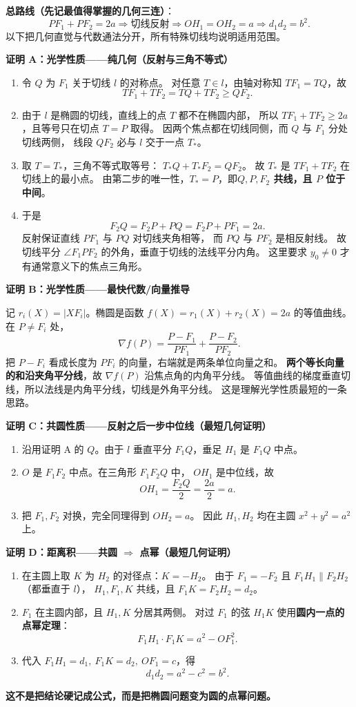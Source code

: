 \begin{proofbox}
\textbf{总路线（先记最值得掌握的几何三连）}：
\[
\boxed{PF_1+PF_2=2a}
\Longrightarrow\boxed{\text{切线反射}}
\Longrightarrow\boxed{OH_1=OH_2=a}
\Longrightarrow\boxed{d_1d_2=b^2}.
\]
以下把几何直觉与代数通法分开，所有特殊切线均说明适用范围。

\medskip
\textbf{证明 A：光学性质——纯几何（反射与三角不等式）}
\begin{enumerate}
\item 令 $Q$ 为 $F_1$ 关于切线 $l$ 的对称点。
对任意 $T\in l$，由轴对称知 $TF_1=TQ$，故
\[
TF_1+TF_2=TQ+TF_2\ge QF_2.
\]
\item 由于 $l$ 是椭圆的切线，直线上的点 $T$ 都不在椭圆内部，
所以 $TF_1+TF_2\ge2a$，且等号只在切点 $T=P$ 取得。
因两个焦点都在切线同侧，而 $Q$ 与 $F_1$ 分处切线两侧，
线段 $QF_2$ 必与 $l$ 交于一点 $T_*$。
\item 取 $T=T_*$，三角不等式取等号：
$T_*Q+T_*F_2=QF_2$。
故 $T_*$ 是 $TF_1+TF_2$ 在切线上的最小点。
由第二步的唯一性，$T_*=P$，即\textbf{$Q,P,F_2$ 共线，且 $P$ 位于中间}。
\item 于是
\[
F_2Q=F_2P+PQ=F_2P+PF_1=2a.
\]
反射保证直线 $PF_1$ 与 $PQ$ 对切线夹角相等，
而 $PQ$ 与 $PF_2$ 是相反射线。
故切线平分 $\angle F_1PF_2$ 的外角，垂直于切线的法线平分内角。
这里要求 $y_0\ne0$ 才有通常意义下的焦点三角形。
\end{enumerate}

\textbf{证明 B：光学性质——最快代数/向量推导}

记 $r_i(X)=|XF_i|$。椭圆是函数
$f(X)=r_1(X)+r_2(X)=2a$ 的等值曲线。
在 $P\ne F_i$ 处，
\[
\nabla f(P)=\frac{P-F_1}{PF_1}+\frac{P-F_2}{PF_2}.
\]
把 $P-F_i$ 看成长度为 $PF_i$ 的向量，右端就是两条单位向量之和。
\textbf{两个等长向量的和沿夹角平分线}，故 $\nabla f(P)$ 沿焦点角的内角平分线。
等值曲线的梯度垂直切线，所以法线是内角平分线，切线是外角平分线。
这是理解光学性质最短的一条思路。

\medskip
\textbf{证明 C：共圆性质——反射之后一步中位线（最短几何证明）}
\begin{enumerate}
\item 沿用证明 A 的 $Q$。由于 $l$ 垂直平分 $F_1Q$，垂足 $H_1$ 是 $F_1Q$ 中点。
\item $O$ 是 $F_1F_2$ 中点。在三角形 $F_1F_2Q$ 中，
$OH_1$ 是中位线，故
\[
OH_1=\frac{F_2Q}{2}=\frac{2a}{2}=a.
\]
\item 把 $F_1,F_2$ 对换，完全同理得到 $OH_2=a$。
因此 $H_1,H_2$ 均在主圆 $x^2+y^2=a^2$ 上。
\end{enumerate}

\textbf{证明 D：距离积——共圆 $\Rightarrow$ 点幂（最短几何证明）}
\begin{enumerate}
\item 在主圆上取 $K$ 为 $H_2$ 的对径点：$K=-H_2$。
由于 $F_1=-F_2$ 且 $F_1H_1\parallel F_2H_2$（都垂直于 $l$），
$H_1,F_1,K$ 共线，且 $F_1K=F_2H_2=d_2$。
\item $F_1$ 在主圆内部，且 $H_1,K$ 分居其两侧。
对过 $F_1$ 的弦 $H_1K$ 使用\textbf{圆内一点的点幂定理}：
\[
F_1H_1\cdot F_1K=a^2-OF_1^2.
\]
\item 代入 $F_1H_1=d_1,\ F_1K=d_2,\ OF_1=c$，得
\[
\boxed{d_1d_2=a^2-c^2=b^2}.
\]
\end{enumerate}
\textbf{这不是把结论硬记成公式，而是把椭圆问题变为圆的点幂问题。}


\end{proofbox}
